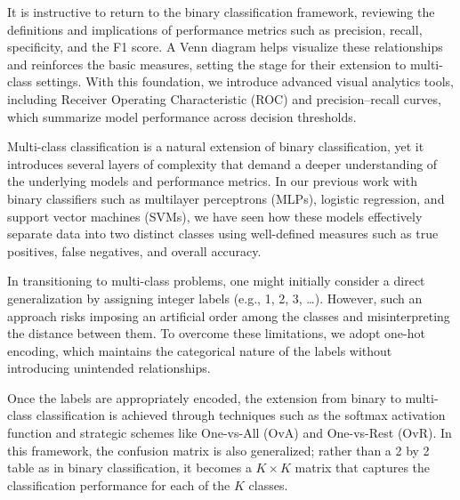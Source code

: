 \documentclass[12pt]{article}
\begin{document}
It is instructive to return to the binary classification framework, reviewing the definitions and implications of performance metrics such as precision, recall, specificity, and the F1 score. A Venn diagram helps visualize these relationships and reinforces the basic measures, setting the stage for their extension to multi-class settings. With this foundation, we introduce advanced visual analytics tools, including Receiver Operating Characteristic (ROC) and precision--recall curves, which summarize model performance across decision thresholds.

Multi-class classification is a natural extension of binary classification, yet it introduces several layers of complexity that demand a deeper understanding of the underlying models and performance metrics. In our previous work with binary classifiers such as multilayer perceptrons (MLPs), logistic regression, and support vector machines (SVMs), we have seen how these models effectively separate data into two distinct classes using well-defined measures such as true positives, false negatives, and overall accuracy.

In transitioning to multi-class problems, one might initially consider a direct generalization by assigning integer labels (e.g., 1, 2, 3, \dots). However, such an approach risks imposing an artificial order among the classes and misinterpreting the distance between them. To overcome these limitations, we adopt one-hot encoding, which maintains the categorical nature of the labels without introducing unintended relationships.

Once the labels are appropriately encoded, the extension from binary to multi-class classification is achieved through techniques such as the softmax activation function and strategic schemes like One-vs-All (OvA) and One-vs-Rest (OvR). In this framework, the confusion matrix is also generalized; rather than a 2 by 2 table as in binary classification, it becomes a \(K \times K\) matrix that captures the classification performance for each of the \(K\) classes.
\end{document}
